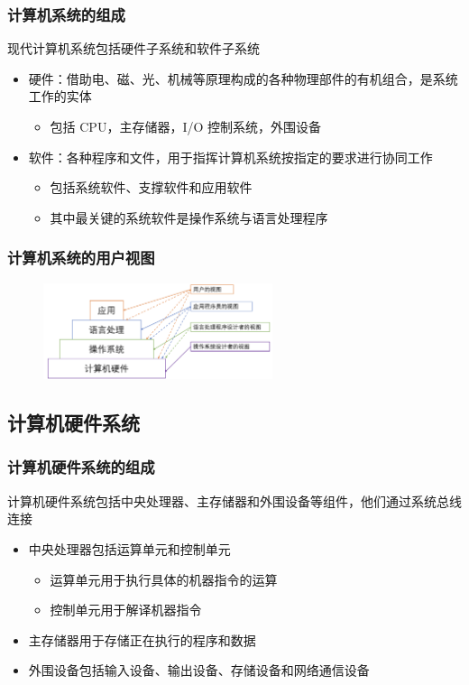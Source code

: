 \documentclass[cs4size,a4paper,10pt]{ctexart}
\begin{document}
	\subsubsection{计算机系统的组成}
	现代计算机系统包括硬件子系统和软件子系统
	\begin{itemize}
		\item 硬件：借助电、磁、光、机械等原理构成的各种物理部件的有机组合，是系统工作的实体
			\begin{itemize}
			\item 包括 CPU，主存储器，I/O 控制系统，外围设备
			\end{itemize}
		\item 软件：各种程序和文件，用于指挥计算机系统按指定的要求进行协同工作
			\begin{itemize}
				\item 包括系统软件、支撑软件和应用软件
				\item 其中最关键的系统软件是操作系统与语言处理程序
			\end{itemize}
	\end{itemize}
	
	

	\subsubsection{计算机系统的用户视图}
	\begin{figure}[ht]
		\centering
		\includegraphics[width=0.6\textwidth]{img/1.1.1.4}
	\end{figure}


	\subsection{计算机硬件系统}
	\subsubsection{计算机硬件系统的组成}
	计算机硬件系统包括中央处理器、主存储器和外围设备等组件，他们通过系统总线连接
	\begin{itemize}
		\item 中央处理器包括运算单元和控制单元
		\begin{itemize}
			\item 运算单元用于执行具体的机器指令的运算
			\item 控制单元用于解译机器指令
		\end{itemize}
		\item 主存储器用于存储正在执行的程序和数据
		\item 外围设备包括输入设备、输出设备、存储设备和网络通信设备
	\end{itemize}
\end{document}
